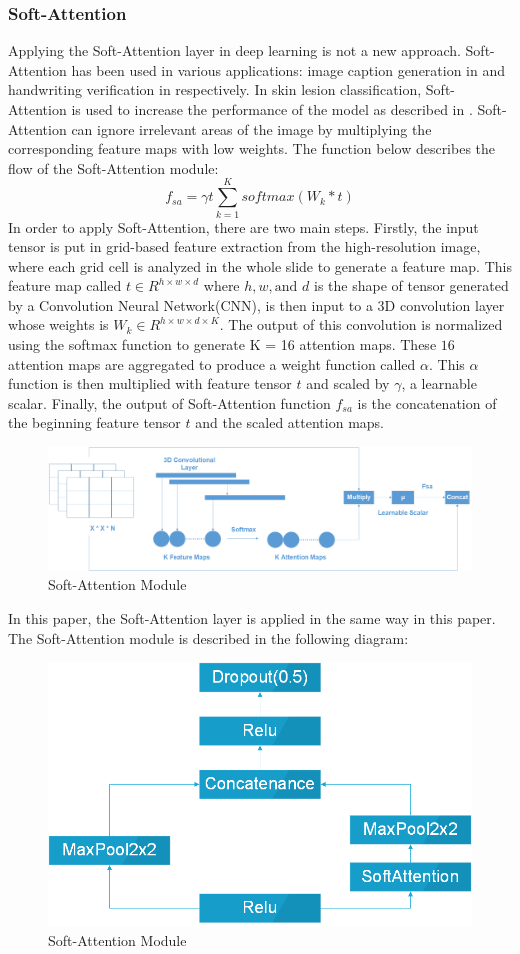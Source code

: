 \documentclass[sensors,article,submit,pdftex,moreauthors]{Definitions/mdpi}
\begin{document}
\subsubsection{Soft-Attention}
Applying the Soft-Attention layer in deep learning is not a new approach. Soft-Attention has been used in various applications: image caption generation in \cite{03044} and handwriting verification in \cite{202017} respectively. In skin lesion classification, Soft-Attention is used to increase the performance of the model as described in \cite{03358}. Soft-Attention can ignore irrelevant areas of the image by multiplying the corresponding feature maps with low weights. The function below describes the flow of the Soft-Attention module:
\[
f_{sa} = \gamma t\sum_{k=1}^{K}softmax(W_k * t)
\]
In order to apply Soft-Attention, there are two main steps. Firstly, the input tensor is put in grid-based feature extraction from the high-resolution image, where each grid cell is analyzed in the whole slide to generate a feature map\cite{08513}. This feature map called $t \in R^{h \times w \times d}$ where $h, w, \text{and } d$ is the shape of tensor generated by a Convolution Neural Network(CNN), is then input to a 3D convolution layer whose weights is $W_k \in R^{h \times w \times d \times K}$. The output of this convolution is normalized using the softmax function to generate K = 16 attention maps. These $16$ attention maps are aggregated to produce a weight function called $\alpha$. This $\alpha$ function is then multiplied with feature tensor $t$ and scaled by $\gamma$, a learnable scalar. Finally, the output of Soft-Attention function $f_{sa}$ is the concatenation of the beginning feature tensor $t$ and the scaled attention maps. 
\FloatBarrier
\begin{figure}[h]
	\centering
	\includegraphics[width=1\linewidth]{Definitions/SoftAttention}
	\caption{Soft-Attention Module}
	\label{fig:softattention}
\end{figure}
\FloatBarrier
In this paper, the Soft-Attention layer is applied in the same way in this paper\cite{03358}. The Soft-Attention module is described in the following diagram:
\FloatBarrier
\begin{figure}[h]
	\centering
	\includegraphics[width=0.5\linewidth]{Definitions/SoftAttentionBlock}
	\caption{Soft-Attention Module}
	\label{fig:softattentionblock}
\end{figure}
\FloatBarrier
\end{document}
